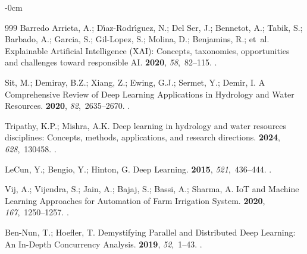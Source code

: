 \documentclass[land,review,accept,pdftex,oneauthor]{Definitions/mdpi}
\begin{document}
\begin{adjustwidth}{-\extralength}{0cm}
\begin{thebibliography}{999}
{Barredo Arrieta}, A.; D{\'\i}az-Rodr{\'\i}guez, N.; {Del Ser}, J.; Bennetot,
  A.; Tabik, S.; Barbado, A.; Garcia, S.; Gil-Lopez, S.; Molina, D.; Benjamins,
  R.;  et~al.
\newblock Explainable Artificial Intelligence (XAI): Concepts, taxonomies,
  opportunities and challenges toward responsible AI.
 {\bf 2020}, {\em 58},~82--115.
.

Sit, M.; Demiray, B.Z.; Xiang, Z.; Ewing, G.J.; Sermet, Y.; Demir, I.
\newblock A Comprehensive Review of Deep Learning Applications in Hydrology and
  Water Resources.
 {\bf 2020}, {\em 82},~2635--2670.
.

Tripathy, K.P.; Mishra, A.K.
\newblock Deep learning in hydrology and water resources disciplines: Concepts,
  methods, applications, and research directions.
 {\bf 2024}, {\em 628},~130458.
.

LeCun, Y.; Bengio, Y.; Hinton, G.
\newblock Deep Learning. %
 {\bf 2015}, {\em 521},~436--444.
.

Vij, A.; Vijendra, S.; Jain, A.; Bajaj, S.; Bassi, A.; Sharma, A.
\newblock IoT and Machine Learning Approaches for Automation of Farm Irrigation
  System.
 {\bf 2020}, {\em 167},~1250--1257.
.

Ben-Nun, T.; Hoefler, T.
\newblock Demystifying Parallel and Distributed Deep Learning: An In-Depth
  Concurrency Analysis.
 {\bf 2019}, {\em 52},~1--43.
.


\end{thebibliography}
\end{adjustwidth}
\end{document}
